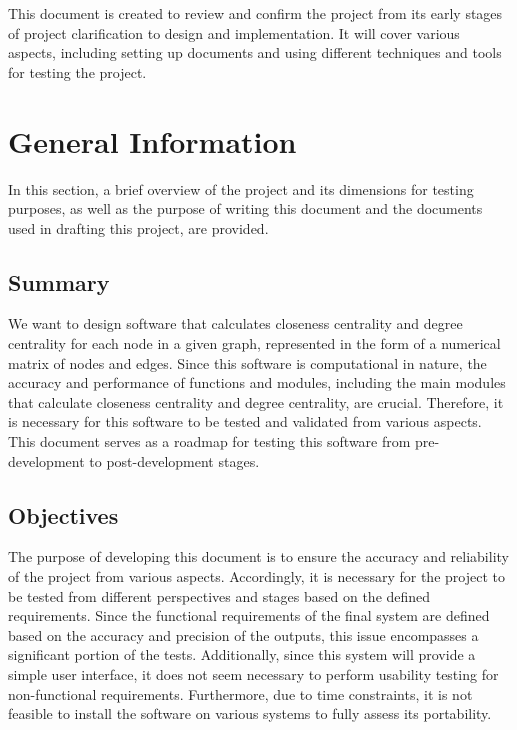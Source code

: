 \documentclass[12pt, titlepage]{article}
\begin{document}
\newpage



This document is created to review and confirm the project from its early stages of project clarification to design and implementation. It will cover various aspects, including setting up documents and using different techniques and tools for testing the project.

\section{General Information}
In this section, a brief overview of the project and its dimensions for testing purposes, as well as the purpose of writing this document and the documents used in drafting this project, are provided.

\subsection{Summary}

We want to design software that calculates closeness centrality and degree centrality for each node in a given graph, represented in the form of a numerical matrix of nodes and edges. Since this software is computational in nature, the accuracy and performance of functions and modules, including the  main modules that calculate closeness centrality and degree centrality, are crucial. Therefore, it is necessary for this software to be tested and validated from various aspects. This document serves as a roadmap for testing this software from pre-development to post-development stages.
\subsection{Objectives}

The purpose of developing this document is to ensure the accuracy and reliability of the project from various aspects. Accordingly, it is necessary for the project to be tested from different perspectives and stages based on the defined requirements. Since the functional requirements of the final system are defined based on the accuracy and precision of the outputs, this issue encompasses a significant portion of the tests. Additionally, since this system will provide a simple user interface, it does not seem necessary to perform usability testing for non-functional requirements. Furthermore, due to time constraints, it is not feasible to install the software on various systems to fully assess its portability.
\end{document}
